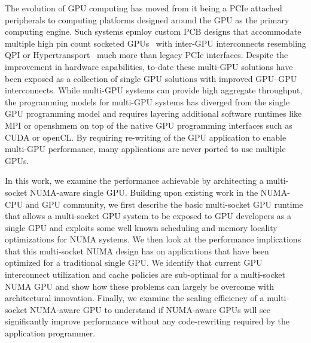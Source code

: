 The evolution of GPU computing has moved from it being a PCIe attached peripherals 
to computing platforms designed around the GPU as the primary computing engine. 
Such systems epmloy custom PCB designs that accommodate multiple high pin count socketed 
GPUs~\cite{DGX} with inter-GPU interconnects resembling QPI or 
Hypertransport~\cite{INTELQPI,AMDHT} much more than legacy PCIe interfaces.  
Despite the improvement in hardware capabilities, to-date these multi-GPU 
solutions have been exposed as a collection of single GPU solutions with improved GPU--GPU 
interconnects. While multi-GPU systems can provide high aggregate throughput, 
the programming models for multi-GPU systems has diverged from the single GPU 
programming model and requires layering additional software runtimes like MPI 
or openshmem on top of the native GPU programming interfaces such as CUDA or openCL.
By requiring re-writing of the GPU application to enable multi-GPU performance, 
many applications are never ported to use multiple GPUs.

In this work, we examine the performance achievable by architecting a 
multi-socket NUMA-aware single GPU.  Building upon existing work in the 
NUMA-CPU and GPU community, we first describe the basic multi-socket GPU runtime 
that allows a multi-socket GPU system to be exposed to GPU developers as a 
single GPU and exploits some well known scheduling and memory locality 
optimizations for NUMA systems. We then look at the performance implications 
that this multi-socket NUMA design has on applications that have been optimized 
for a traditional single GPU.  We identify that current GPU interconnect 
utilization and cache policies are sub-optimal for a multi-socket NUMA GPU and 
show how these problems can largely be overcome with architectural innovation.  
Finally, we examine the scaling efficiency of a multi-socket NUMA-aware GPU to 
understand if NUMA-aware GPUs will see significantly improve performance  
without any code-rewriting required by the application programmer.

